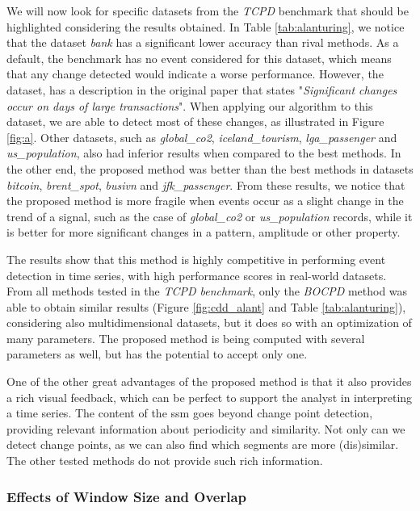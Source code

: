 We will now look for specific datasets from the \textit{TCPD} benchmark that should be highlighted considering the results obtained. In Table \ref{tab:alanturing}, we notice that the dataset \textit{bank} has a significant lower accuracy than rival methods. As a default, the benchmark has no event considered for this dataset, which means that any change detected would indicate a worse performance. However, the dataset, has a description in the original paper that states "\textit{Significant changes occur on days of large transactions}". When applying our algorithm to this dataset, we are able to detect most of these changes, as illustrated in Figure \ref{fig:a}. Other datasets, such as \textit{global\_co2}, \textit{iceland\_tourism}, \textit{lga\_passenger} and \textit{us\_population}, also had inferior results when compared to the best methods. In the other end, the proposed method was better than the best methods in datasets \textit{bitcoin}, \textit{brent\_spot}, \textit{busivn} and \textit{jfk\_passenger}. From these results, we notice that the proposed method is more fragile when events occur as a slight change in the trend of a signal, such as the case of \textit{global\_co2} or \textit{us\_population} records, while it is better for more significant changes in a pattern, amplitude or other property.
\par
The results show that this method is highly competitive in performing event detection in time series, with high performance scores in real-world datasets. From all methods tested in the \textit{TCPD benchmark}, only the \textit{BOCPD} method was able to obtain similar results (Figure \ref{fig:cdd_alant} and Table \ref{tab:alanturing}), considering also multidimensional datasets, but it does so with an optimization of many parameters. The proposed method is being computed with several parameters as well, but has the potential to accept only one.
\par
One of the other great advantages of the proposed method is that it also provides a rich visual feedback, which can be perfect to support the analyst in interpreting a time series. The content of the \gls{ssm} goes beyond change point detection, providing relevant information about periodicity and similarity. Not only can we detect change points, as we can also find which segments are more (dis)similar. The other tested methods do not provide such rich information.

\subsubsection{Effects of Window Size and Overlap}


